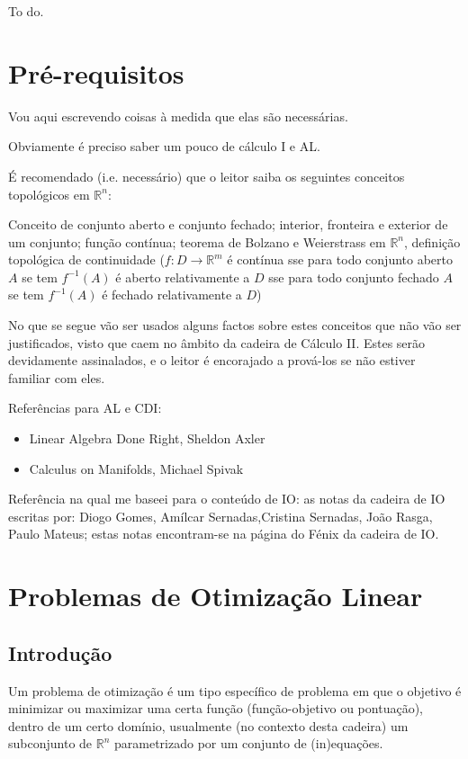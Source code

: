 \documentclass{article}
\newcommand{\R}{\mathbb{R}}
\theoremstyle{definition}
\begin{document}
	To do.
	
	\section{Pré-requisitos}
	
	Vou aqui escrevendo coisas à medida que elas são necessárias.
	
	Obviamente é preciso saber um pouco de cálculo I e AL.
	
	É recomendado (i.e. necessário) que o leitor saiba os seguintes conceitos topológicos em $\R^n$:
	
	Conceito de conjunto aberto e conjunto fechado; interior, fronteira e exterior de um conjunto; função contínua; teorema de Bolzano e Weierstrass em $\R^n$, definição topológica de continuidade ($f : D \rightarrow \R^m$ é contínua sse para todo conjunto aberto $A$ se tem $f^{-1}(A)$ é aberto relativamente a $D$ sse para todo conjunto fechado $A$ se tem $f^{-1}(A)$ é fechado relativamente a $D$)
	
	No que se segue vão ser usados alguns factos sobre estes conceitos que não vão ser justificados, visto que caem no âmbito da cadeira de Cálculo II. Estes serão devidamente assinalados, e o leitor é encorajado a prová-los se não estiver familiar com eles.
	
	Referências para AL e CDI:
	\begin{itemize}
	\item Linear Algebra Done Right, Sheldon Axler
	\item Calculus on Manifolds, Michael Spivak
	\end{itemize}
	
	Referência na qual me baseei para o conteúdo de IO: as notas da cadeira de IO escritas por: Diogo Gomes, Amílcar Sernadas,Cristina Sernadas, João Rasga, Paulo Mateus; estas notas encontram-se na página do Fénix da cadeira de IO.
	
	\section{Problemas de Otimização Linear}
	
	\subsection{Introdução}
	
	
	Um problema de otimização é um tipo específico de problema em que o objetivo é minimizar ou maximizar uma certa função (função-objetivo ou pontuação), dentro de um certo domínio, usualmente (no contexto desta cadeira) um subconjunto de $\R^n$ parametrizado por um conjunto de (in)equações.
	
\end{document}
